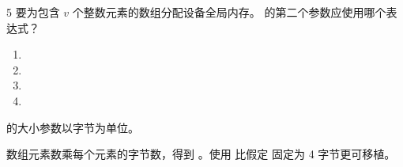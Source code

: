 \begin{solutionexercise}{5}
\problemheading 要为包含 $v$ 个整数元素的数组分配设备全局内存。
 的第二个参数应使用哪个表达式？
\begin{enumerate}[label=\alph*.,leftmargin=2.2em]
  \item {}
  \item {}
  \item {}
  \item {}
\end{enumerate}

\approachheading {} 的大小参数以字节为单位。

\answerheading 数组元素数乘每个元素的字节数，得到
。使用  比假定  固定为 4 字节更可移植。


\end{solutionexercise}
